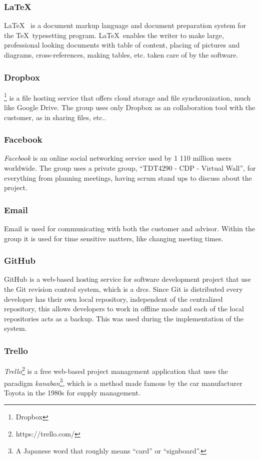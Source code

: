 \documentclass[11pt]{book}
\begin{document}
\subsubsection{\LaTeX}
\LaTeX~\cite{latex} is a document markup language and document preparation system for the \TeX~typesetting program. \LaTeX~enables the writer to make large, professional looking documents with table of content, placing of pictures and diagrams, cross-references, making tables, etc. taken care of by the software. 

\subsubsection{Dropbox}
\footnote{Dropbox}\cite{dropbox} is a file hosting service that offers cloud storage and file synchronization, much like Google Drive. The group uses only Dropbox as an collaboration tool with the customer, as in sharing files, etc..

\subsubsection{Facebook}
\emph{Facebook} is an online social networking service used by 1 110 million users worldwide\cite{facebook}. The group uses a private group, ``TDT4290 - CDP - Virtual Wall'', for everything from planning meetings, having scrum stand ups to discuss about the project.

\subsubsection{Email}
Email is used for communicating with both the customer and advisor. Within the group it is used for time sensitive matters, like changing meeting times.

\subsubsection{GitHub}
GitHub\cite{github} is a web-based hosting service for software development project that use the Git revision control system, which is a \gls{drcs}. Since Git is distributed every developer has their own local repository, independent of the centralized repository, this allows developers to work in offline mode and each of the local repositories acts as a backup. This was used during the implementation of the system.

\subsubsection{Trello}
\emph{Trello}\footnote{https://trello.com/} is a free web-based project management application that uses the paradigm \emph{kanaban}\footnote{A Japanese word that roughly means ``card'' or ``signboard''.}, which is a method made famous by the car manufacturer Toyota in the 1980s for supply management. 
\end{document}
